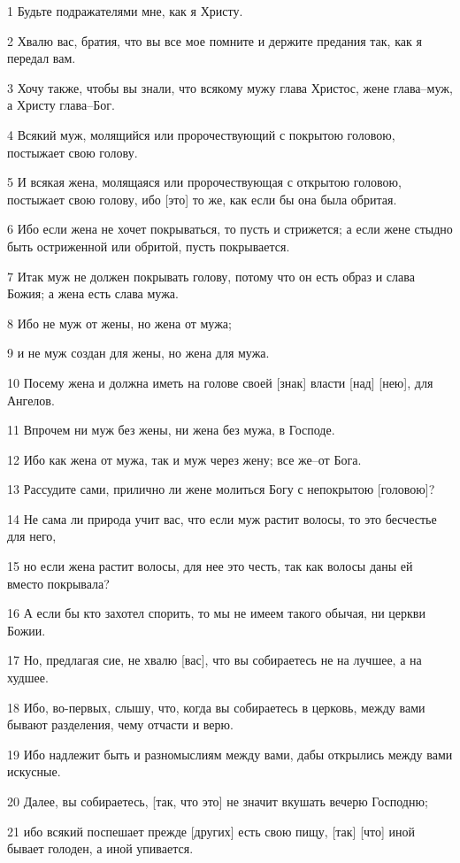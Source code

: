 \par 1 Будьте подражателями мне, как я Христу.
\par 2 Хвалю вас, братия, что вы все мое помните и держите предания так, как я передал вам.
\par 3 Хочу также, чтобы вы знали, что всякому мужу глава Христос, жене глава--муж, а Христу глава--Бог.
\par 4 Всякий муж, молящийся или пророчествующий с покрытою головою, постыжает свою голову.
\par 5 И всякая жена, молящаяся или пророчествующая с открытою головою, постыжает свою голову, ибо [это] то же, как если бы она была обритая.
\par 6 Ибо если жена не хочет покрываться, то пусть и стрижется; а если жене стыдно быть остриженной или обритой, пусть покрывается.
\par 7 Итак муж не должен покрывать голову, потому что он есть образ и слава Божия; а жена есть слава мужа.
\par 8 Ибо не муж от жены, но жена от мужа;
\par 9 и не муж создан для жены, но жена для мужа.
\par 10 Посему жена и должна иметь на голове своей [знак] власти [над] [нею], для Ангелов.
\par 11 Впрочем ни муж без жены, ни жена без мужа, в Господе.
\par 12 Ибо как жена от мужа, так и муж через жену; все же--от Бога.
\par 13 Рассудите сами, прилично ли жене молиться Богу с непокрытою [головою]?
\par 14 Не сама ли природа учит вас, что если муж растит волосы, то это бесчестье для него,
\par 15 но если жена растит волосы, для нее это честь, так как волосы даны ей вместо покрывала?
\par 16 А если бы кто захотел спорить, то мы не имеем такого обычая, ни церкви Божии.
\par 17 Но, предлагая сие, не хвалю [вас], что вы собираетесь не на лучшее, а на худшее.
\par 18 Ибо, во-первых, слышу, что, когда вы собираетесь в церковь, между вами бывают разделения, чему отчасти и верю.
\par 19 Ибо надлежит быть и разномыслиям между вами, дабы открылись между вами искусные.
\par 20 Далее, вы собираетесь, [так, что это] не значит вкушать вечерю Господню;
\par 21 ибо всякий поспешает прежде [других] есть свою пищу, [так] [что] иной бывает голоден, а иной упивается.
